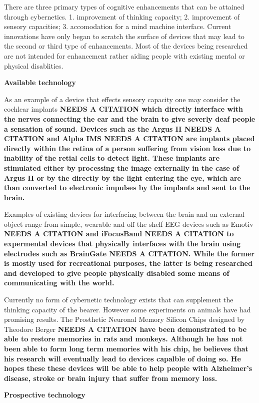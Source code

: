 There are three primary types of cognitive enhancements that can be attained through cybernetics. 1. improvement of thinking capacity; 2. improvement of sensory capacities; 3. accomodation for a mind machine interface. Current innovations have only began to scratch the surface of devices that may lead to the second or third type of enhancements. Most of the devices being researched are not intended for enhancement rather aiding people with existing mental or physical disablities. 

\bf{Available technology}

As an example of a device that effects sensory capacity one may consider the cochlear implants \bf{NEEDS A CITATION} which directly interface with the nerves connecting the ear and the brain to give severly deaf people a sensation of sound. Devices such as the Argus II \bf{NEEDS A CITATION} and Alpha IMS \bf{NEEDS A CITATION} are implants placed directly within the retina of a person suffering from vision loss due to inability of the retial cells to detect light. These implants are stimulated either by processing the image externally in the case of Argus II or by the directly by the light entering the eye, which are than converted to electronic impulses by the implants and sent to the brain. 

Examples of existing devices for interfacing between the brain and an external object range from simple, wearable and off the shelf EEG devices such as Emotiv \bf{NEEDS A CITATION} and iFocusBand \bf{NEEDS A CITATION} to expermental devices that physically interfaces with the brain using electrodes such as BrainGate \bf{NEEDS A CITATION}. While the former is mostly used for recreational purposes, the latter is being researched and developed to give people physically disabled some means of communicating with the world.

Currently no form of cybernetic technology exists that can supplement the thinking capacity of the bearer. However some experiments on animals have had promising results. The Prosthetic Neuronal Memory Silicon Chips designed by Theodore Berger \bf{NEEDS A CITATION} have been demonstrated to be able to restore memories in rats and monkeys. Although he has not been able to form long term memories with his chip, he believes that his research will eventually lead to devices capalble of doing so. He hopes these these devices will be able to help people with Alzheimer's disease, stroke or brain injury that suffer from memory loss.


\bf{Prospective technology}


